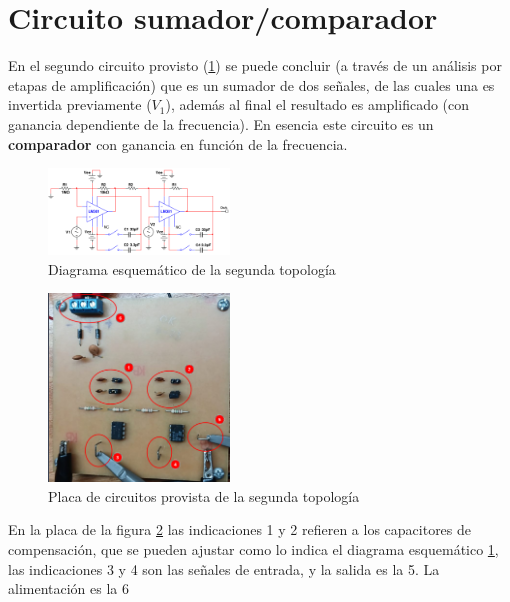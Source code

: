 \documentclass[letterpaper, 10 pt, conference]{ieeeconf}  %
\begin{document}
\section{Circuito sumador/comparador}
En el segundo circuito provisto (\ref{fig:diag-top-2}) se puede concluir (a través de un análisis por etapas de amplificación) que es un sumador de dos señales, de las cuales una es invertida previamente ($V_{1}$), además al final el resultado es amplificado (con ganancia dependiente de la frecuencia). En esencia este circuito es un \textbf{comparador} con ganancia en función de la frecuencia.
\begin{figure}[H]
  \centering
  \includegraphics[width=0.43\textwidth]{./Imagenes/topologia2.png}
  \caption{Diagrama esquemático de la segunda topología}
  \label{fig:diag-top-2}
\end{figure}
\begin{figure}[H]
  \centering
  \includegraphics[width=0.43\textwidth]{./Imagenes/topologia2_placa.png}
  \caption{Placa de circuitos provista de la segunda topología}
  \label{pic:topologia2_placa}
\end{figure}

En la placa de la figura \ref{pic:topologia2_placa} las indicaciones 1 y 2 refieren a los capacitores de compensación, que se pueden ajustar como lo indica el diagrama esquemático \ref{fig:diag-top-2}, las indicaciones 3 y 4 son las señales de entrada, y la salida es la 5. La alimentación es la 6
\end{document}
